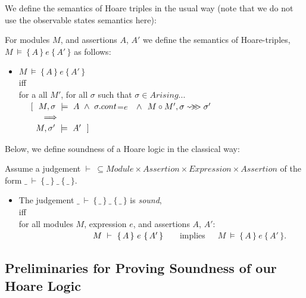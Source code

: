  




We define the semantics of Hoare triples in the usual way (note that we do not use the observable states semantics here): 

\begin{definition}

For modules $M$, and assertions $A$, $A'$   we define the semantics of Hoare-triples, 
 $M\ \models\  \{\, A \,  \}\ e\  \{\, A' \, \}$ as follows:
\begin{itemize}
\item
$M\ \models\  \{\, A \,  \}\ e\  \{\, A' \, \}$ \\
iff\\
 for a all $M'$, for all $\sigma$ such that $\sigma \in Arising ...$ \\
$\strut ~ ~ ~ ~ [ \ \ M,\sigma \ \models \ A \ \wedge\  
 \sigma.cont$=$e$ $\ \ \wedge\  \ M\circ M', \sigma \leadsto\!\! \!>\! \!> {\sigma'} $
 \\
$\strut ~ ~ ~ ~ \ \  \ \ \Longrightarrow$ \\
$\strut ~ ~ ~ ~ \ \ M,\sigma' \ \models \ A'\ \ ]$
\end{itemize}
\end{definition}

Below, we define soundness of a Hoare logic in the classical way:

\begin{definition}

Assume a judgement $\vdash \ \subseteq Module \times Assertion \times Expression \times Assertion$ of the form
$\_ \ \vdash\  \{\, \_ \,  \}\ \_ \  \{\, \_ \, \}$.\\
\begin{itemize}
\item
The judgement $\_ \ \vdash\  \{\, \_ \,  \}\ \_ \  \{\, \_ \, \}$ is {\emph {sound}}, \\ iff \\
for all modules $M$, expression $e$, and assertions $A$, $A'$:\\
$\strut\hspace{3cm} \ M\ \vdash\  \{\, A \,  \}\ e\  \{\, A' \, \}$ \ \ \  implies\ \ \ 
 $M\ \models\  \{\, A \,  \}\ e\  \{\, A' \, \}$.
\end{itemize}
 \end{definition}
 
 \subsection{Preliminaries for Proving Soundness of our Hoare Logic}
 
